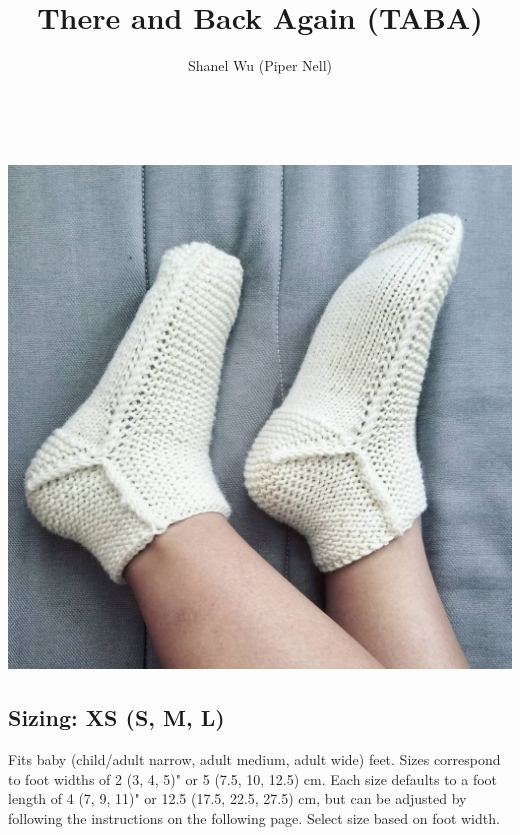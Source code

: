 \documentclass[12pt]{article}
\title{There and Back Again (TABA)} %
\author{Shanel Wu (Piper Nell)}
\begin{document}
\begin{titlingpage}


{\selectfont
\HUGE\textbf{\thetitle}\\ %
\normalsize\theauthor
}

\begin{multicols}{2}

\includegraphics[width=\linewidth]{taba.jpg}


\vspace{-1em}
\subsection*{Sizing: XS (S, M, L)}

Fits baby (child/adult narrow, adult medium, adult wide) feet. Sizes correspond to foot widths of 2 (3, 4, 5)" or 5 (7.5, 10, 12.5) cm. Each size defaults to a foot length of 4 (7, 9, 11)" or 12.5 (17.5, 22.5, 27.5) cm, but can be adjusted by following the instructions on the following page. Select size based on foot width.


\end{multicols}
\end{titlingpage}
\end{document}
